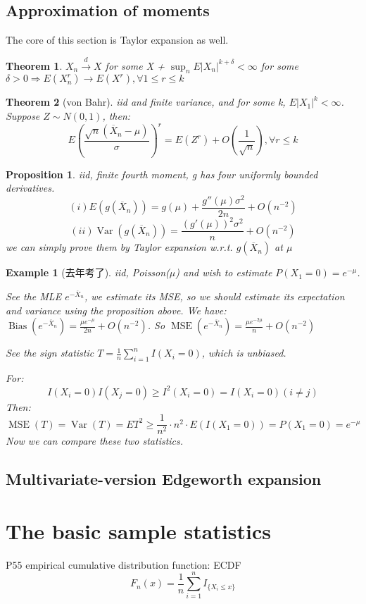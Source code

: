 \documentclass{ctexart}
\newtheorem{theorem}{Theorem}[subsection]
\newtheorem{example}{Example}[subsection]
\newtheorem{proposition}{Proposition}[subsection]
\begin{document}
\subsection{Approximation of moments}
The core of this section is Taylor expansion as well.

\begin{theorem}
  \(X_{n}\xrightarrow{d}X\) for some X + \(\sup_{n} E|X_{n}|^{k+\delta}<\infty\) for some \(\delta>0 \Rightarrow E(X_{n}^{r})\to E(X^{r}), \forall 1\le r \le k\)   
\end{theorem}
\begin{theorem}[von Bahr]
  iid and finite variance, and for some k, \(E|X_{1}|^{k}<\infty\). Suppose \(Z\sim N(0,1)\), then: 
  \[
  E(\frac{\sqrt{n}(\overline{X}_n-\mu)}{\sigma})^{r}=E(Z^{r})+O(\frac{1}{\sqrt{n}}) ,\forall r\le k
  \]   
\end{theorem}
\begin{proposition}
  iid, finite fourth moment, g has four uniformly bounded derivatives. 
  \[
  (i)E(g(\overline{X}_n))=g(\mu)+\frac{g''(\mu)\sigma^{2}}{2n}+O(n^{-2})  
  \] 
  \[
  (ii)\operatorname{Var}(g(\overline{X}_{n}))=\frac{(g'(\mu))^{2}\sigma^{2}}{n}+O(n^{-2})
  \] 
  we can simply prove them by Taylor expansion w.r.t. \(g(\overline{X}_{n})\) at \(\mu\) 
\end{proposition}
\begin{example}[去年考了]
  iid, Poisson(\(\mu\)) and wish to estimate \(P(X_{1}=0)=e^{-\mu}\).
  
  See the MLE \(e^{-\overline{X}_{n}}\), we estimate its MSE, so we should estimate its expectation and variance using the proposition above. 
  We have: \(\operatorname{Bias}(e^{-\overline{X}_{n}})=\frac{\mu e^{-\mu}}{2n}+O(n^{{-2}})\). So \(\operatorname{MSE}(e^{-\overline{X}_n})=\frac{\mu e^{-2\mu}}{n}+O(n^{{-2}})\)   

  See the sign statistic \(T=\frac{1}{n}\sum_{i=1}^{n} I(X_{i}=0)\), which is unbiased. 
  
  For: 
  \[
  I(X_{i}=0)I(X_{j}=0)\ge I^{2}(X_{i}=0)=I(X_{i}=0)(i\neq j)
  \] 
  Then: 
  \[
  \operatorname{MSE}(T)=\operatorname{Var}(T)=ET^{2}\ge \frac{1}{n^{2}}\cdot n^{2}\cdot E(I(X_{1}=0))=P(X_{1}=0)=e^{-\mu}
  \] 
  Now we can compare these two statistics. 
\end{example}
\subsection{Multivariate-version Edgeworth expansion}
\section{The basic sample statistics}
P55
empirical cumulative distribution function: ECDF
\[
F_{n}(x)=\frac{1}{n}\sum_{i=1}^{n} I_{\{X_{i}\le x\}}
\] 
\end{document}
